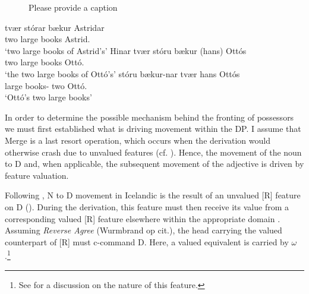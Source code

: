 \documentclass[output=paper,colorlinks,citecolor=brown,
]{langscibook}
\begin{document}
\begin{figure}
\caption{\color{red}Please provide a caption}\label{hardarsonFullesque}
\end{figure}

\begin{exe}
\ex \begin{xlist}
	\ex	\gll	tvær stórar bækur Astridar \label{hardarsonND}\\
				two large books Astrid.\hardGen{}\\
		\glt	`two large books of Astrid's'
	\ex	\gll	Hinar tvær stóru bækur (hans) Ottós\label{hardarsonFD}\\
				\hardArt{} two large books \hardProp{} Ottó.\hardGen{}\\
		\glt	`the two large books of Ottó's'
	\ex	\gll	stóru bækur-nar tvær hans Ottós \label{hardarsonBD}\\
				large books-\hardArt{} two \hardProp{} Ottó.\hardGen\\
		\glt	`Ottó's two large books'
	\end{xlist}
\end{exe}

In order to determine the possible mechanism behind the fronting of possessors we must first established what is driving movement within the DP. 
I assume that Merge is a last resort operation, which occurs when the derivation would otherwise crash due to unvalued features (cf. \citealt{abels2003,boskovic2007,AgreementLooking:2012wf,Wurmbrand:2013tf,Wurmbrand:2012ty,Wurmbrand:uv,Wurmbrand:2014vz,Wurmbrand:2011ua,Wurmbrand:2013tb}). Hence, the movement of the noun to D and, when applicable, the subsequent movement of the adjective is driven by feature valuation.

Following \citet{Hardarson:2016wd}, N to D movement in Icelandic is the result of an unvalued [R] feature on D (). During the derivation, this feature must then receive its value from a corresponding valued [R] feature elsewhere within the appropriate domain \citep[e.g.,][]{pesetsky2007}. Assuming \textit{Reverse Agree} (Wurmbrand op cit.), the head carrying the valued counterpart of [R] must c-command D. Here, a valued equivalent is carried by $\omega$ \citet[147ff]{Hardarson:2016wd}.\footnote{See \citet[147ff]{Hardarson:2016wd} for a discussion on the nature of this feature.}
\end{document}
